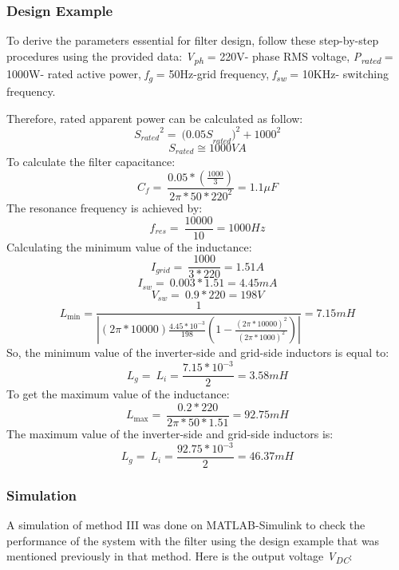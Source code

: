 \documentclass[12pt,a4paper]{book}
\begin{document}
\subsubsection{Design Example}
To derive the parameters essential for filter design, follow these step-by-step procedures using the provided data: \emph{V\textsubscript{ph}} = 220V- phase RMS voltage, \emph{P\textsubscript{rated}} = 1000W- rated active power, \emph{f\textsubscript{g}} = 50Hz-grid frequency, \emph{f\textsubscript{sw}} = 10KHz- switching frequency.

Therefore, rated apparent power can be calculated as follow:
\[{S_{rated}}^{2} = \ {{(0.05S}_{rated})}^{2} + 1000^{2}\]
\[S_{rated} \cong 1000VA\]
To calculate the filter capacitance:
\[C_{f} = \ \frac{0.05*(\frac{1000}{3})}{2\pi*50*220^{2}} = 1.1\mu F\]
The resonance frequency is achieved by:
\[f_{res} = \ \frac{10000}{10} = 1000Hz\]
Calculating the minimum value of the inductance:
\[I_{grid} = \ \frac{1000}{3*220} = 1.51A\]
\[I_{sw} = \ 0.003*1.51 = 4.45mA\]
\[V_{sw} = \ 0.9*220 = 198V\]
\[L_{\min} = \frac{1}{|(2\pi*10000)\frac{4.45*10^{- 3}}{198}\left( 1 - \frac{{(2\pi*10000)}^{2}}{{(2\pi*1000)}^{2}} \right)|} = 7.15mH\]
So, the minimum value of the inverter-side and grid-side inductors is equal to:
\[L_{g} = \ L_{i} = \frac{7.15*10^{- 3}}{2} = 3.58mH\]
To get the maximum value of the inductance:
\[L_{\max} = \ \frac{0.2*220}{2\pi*50*1.51} = 92.75mH\]
The maximum value of the inverter-side and grid-side inductors is:
\[L_{g} = \ L_{i} = \frac{92.75*10^{- 3}}{2} = 46.37mH\]

\subsubsection{Simulation}
A simulation of method III was done on MATLAB-Simulink to check the performance of the system with the filter using the design example that was mentioned previously in that method. Here is the output voltage \emph{V\textsubscript{DC}}:
\end{document}
